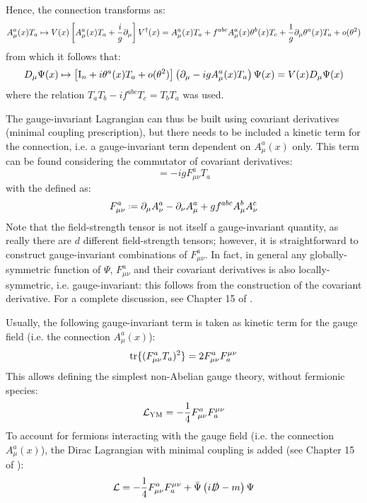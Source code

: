 Hence, the connection transforms as:
\begin{equation*}
  A_\mu^a(x) T_a \mapsto V(x) \left[ A_\mu^a(x) T_a + \frac{i}{g} \partial_\mu \right] V^\dagger(x) = A_\mu^a(x) T_a + f^{abc} A_\mu^a(x) \theta^b(x) T_c + \frac{1}{g} \partial_\mu \theta^a(x) T_a + o(\theta^2)
\end{equation*}
from which it follows that:
\begin{equation*}
  D_\mu \Psi(x) \mapsto \left[ \mathrm{I}_n + i \theta^a(x) T_a + o(\theta^2) \right] \left( \partial_\mu - i g A_\mu^a(x) T_a \right) \Psi(x) = V(x) D_\mu \Psi(x)
\end{equation*}
where the relation $ T_a T_b - i f^{abc} T_c = T_b T_a $ was used.

The gauge-invariant Lagrangian can thus be built using covariant derivatives (minimal coupling prescription), but there needs to be included a kinetic term for the connection, i.e. a gauge-invariant term dependent on $ A_\mu^a(x) $ only. This term can be found considering the commutator of covariant derivatives:
\begin{equation}
  [D_\mu , D_\nu] = - i g F_{\mu \nu}^a T_a
\end{equation}
with the  defined as:
\begin{equation}
  F_{\mu \nu}^a \defeq \pa_\mu A_\nu^a - \pa_\nu A_\mu^a + g f^{abc} A_\mu^b A_\nu^c
  \label{eq:field-str}
\end{equation}
Note that the field-strength tensor is not itself a gauge-invariant quantity, as really there are $ d $ different field-strength tensors; however, it is straightforward to construct gauge-invariant combinations of $ F_{\mu \nu}^a $. In fact, in general any globally-symmetric function of $ \Psi $, $ F_{\mu \nu}^a $ and their covariant derivatives is also locally-symmetric, i.e. gauge-invariant: this follows from the construction of the covariant derivative. For a complete discussion, see Chapter 15 of \cite{Peskin-1995}.

Usually, the following gauge-invariant term is taken as kinetic term for the gauge field (i.e. the connection $ A_\mu^a(x) $):
\begin{equation}
  \operatorname{tr} \{(F_{\mu \nu}^a T_a)^2\} = 2 F_{\mu \nu}^a F^{\mu \nu}_a
\end{equation}
This allows defining the simplest non-Abelian gauge theory,  without fermionic species:
\begin{equation}
  \mathcal{L}_\text{YM} = - \frac{1}{4} F_{\mu \nu}^a F^{\mu \nu}_a
\end{equation}
To account for fermions interacting with the gauge field (i.e. the connection $ A_\mu^a(x) $), the Dirac Lagrangian with minimal coupling is added (see Chapter 15 of \cite{Weinberg-1996}):
\begin{equation}
  \mathcal{L} = - \frac{1}{4} F_{\mu \nu}^a F^{\mu \nu}_a + \bar{\Psi} \left( i \slashed{D} - m \right) \Psi
  \label{eq:qcd-lag}
\end{equation}

